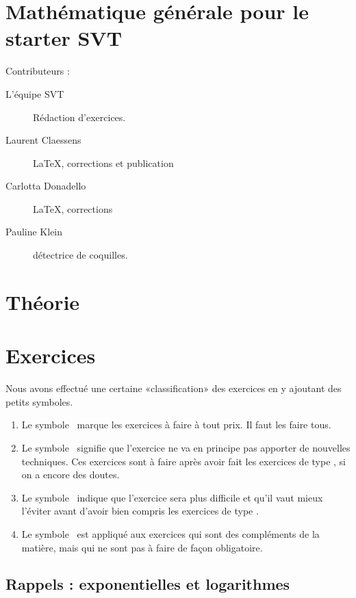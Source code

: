 \chapter{Mathématique générale pour le starter SVT}

Contributeurs :
\begin{description}
    \item[L'équipe SVT] Rédaction d'exercices.
    \item[Laurent Claessens] \LaTeX, corrections et publication
    \item[Carlotta Donadello] \LaTeX, corrections
    \item[Pauline Klein] détectrice de coquilles.
\end{description}


\chapter{Théorie}


\chapter{Exercices}

Nous avons effectué une certaine «classification» des exercices en y ajoutant des petits symboles.
\begin{enumerate}
	\item Le symbole \minsyndical\ marque les exercices à faire à tout prix. Il faut les faire tous.
	\item Le symbole \boringexo\ signifie que l'exercice ne va en principe pas apporter de nouvelles techniques. Ces exercices sont à faire après avoir fait les exercices de type \minsyndical, si on a encore des doutes.
	\item Le symbole \coolexo\ indique que l'exercice sera plus difficile et qu'il vaut mieux l'éviter avant d'avoir bien compris les exercices de type \minsyndical.
	\item Le symbole \mortelexo\ est appliqué aux exercices qui sont des compléments de la matière, mais qui ne sont pas à faire de façon obligatoire.
\end{enumerate}

\section{Rappels : exponentielles et logarithmes}



